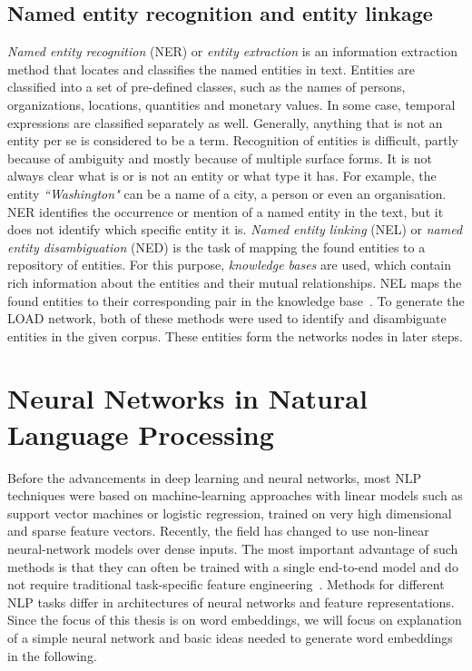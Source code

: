 \subsection{Named entity recognition and  entity linkage}
\emph{Named entity recognition} (NER) or \emph{entity extraction} is an information extraction method that locates and classifies the named entities in text. Entities are classified into a set of pre-defined classes, such as the names of persons, organizations, locations, quantities and monetary values. In some case, temporal expressions are classified separately as well. Generally, anything that is not an entity per se is considered to be a term. Recognition of entities is difficult, partly because of ambiguity and mostly because of multiple surface forms. It is not always clear what is or is not an entity or what type it has. For example, the entity \emph{``Washington"} can be a name of a city, a person or even an organisation. NER identifies the occurrence or mention of a named entity in the text, but it does not identify which specific entity it is. \emph{Named entity linking} (NEL) or \emph{named entity disambiguation} (NED) is the task of mapping the found entities to a repository of entities. For this purpose, \emph{knowledge bases} are used, which contain rich information about the entities and their mutual relationships. NEL maps the found entities to their corresponding pair in the knowledge base~. To generate the LOAD network, both of these methods were used to identify and disambiguate entities in the given corpus. These entities form the networks nodes in later steps. 

\section{Neural Networks  in Natural Language Processing }\label{sec:nn}
Before the advancements in deep learning and neural networks, most NLP techniques were based on machine-learning approaches with linear models such as support vector machines or logistic regression, trained on very high dimensional and sparse feature vectors. Recently, the field has changed to use non-linear neural-network models over dense inputs. The most important advantage of such methods is that they can often be trained with a single end-to-end model and do not require traditional task-specific feature engineering~. Methods for different NLP tasks differ in architectures of neural networks and feature representations. Since the focus of this thesis is on word embeddings, we will focus on explanation of a simple neural network and basic ideas needed to generate word embeddings in the following. 
